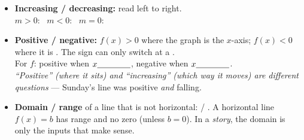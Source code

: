 \documentclass[12pt]{article}
\begin{document}
\begin{tcolorbox}
\vspace{8pt}
\begin{itemize}[leftmargin=1.1em, itemsep=8pt]
  \item \textbf{Increasing / decreasing:} read left to right. \\[4pt]
        \mbox{$m>0$: \blank{2.2cm}} \quad \mbox{$m<0$: \blank{2.2cm}} \quad
        \mbox{$m=0$: \blank{2.2cm}}
  \item \textbf{Positive / negative:} $f(x)>0$ where the graph is \blank{1.8cm} the $x$-axis;
        $f(x)<0$ where it is \blank{1.8cm}. The sign can only switch at a \blank{1.8cm}. \\[4pt]
        For $f$: positive when $x \blank{1.4cm}$, negative when $x \blank{1.4cm}$. \\[4pt]
        \emph{``Positive'' (where it sits) and ``increasing'' (which way it moves) are different
        questions} --- Sunday's line was positive \emph{and} falling.
  \item \textbf{Domain / range} of a line that is not horizontal: \blank{2.8cm} /
        \blank{2.8cm}. A horizontal line $f(x)=b$ has range \blank{1.6cm} and no zero (unless
        $b=0$). In a \emph{story}, the domain is only the inputs that make sense.
\end{itemize}
\end{tcolorbox}
\end{document}
